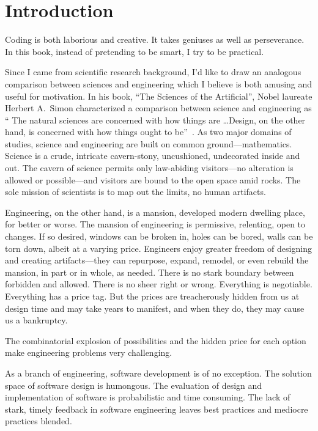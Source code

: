 \chapter{Introduction}\label{ch:intro}

Coding is both laborious and creative.
It takes geniuses as well as perseverance.
In this book, instead of pretending to be smart, I try to be practical.

Since I came from scientific research background,
I'd like to draw an analogous comparison between sciences and engineering
which I believe is both amusing and useful for motivation.
In his book, ``The Sciences of the Artificial'', Nobel laureate Herbert A.\
Simon characterized a comparison between science and engineering as `` The natural sciences are concerned
with how things are \ldots Design, on the other hand,
is concerned with how things ought to be''~\cite{Herbert-Simon-1996}.
As two major domains of studies, science and engineering are built on common ground---mathematics.
Science is a crude, intricate cavern-stony, uncushioned, undecorated inside and out.
The cavern of science permits only law-abiding visitors---no alteration is allowed or possible---and
visitors are bound to the open space amid rocks.
The sole mission of scientists is to map out the limits, no human artifacts.

Engineering, on the other hand, is a mansion, developed modern dwelling place, for better or
worse.
The mansion of engineering is permissive, relenting, open to changes.
If so desired, windows can be broken in, holes can be bored, walls can be torn down,
albeit at a varying price.
Engineers enjoy greater freedom of designing and creating artifacts---they can repurpose,
expand, remodel, or even rebuild the mansion, in part or in whole, as needed.
There is no stark boundary between forbidden and allowed.
There is no sheer right or wrong.
Everything is negotiable.
Everything has a price tag.
But the prices are treacherously hidden from us at design time and may take years to manifest,
and when they do, they may cause us a bankruptcy.

The combinatorial explosion of possibilities and the hidden price for each
option make engineering problems very challenging.

As a branch of engineering, software development is of no exception.
The solution space of software design is humongous.
The evaluation of design and implementation of software is probabilistic and time consuming.
The lack of stark, timely feedback in software engineering leaves best practices and mediocre
practices blended.

